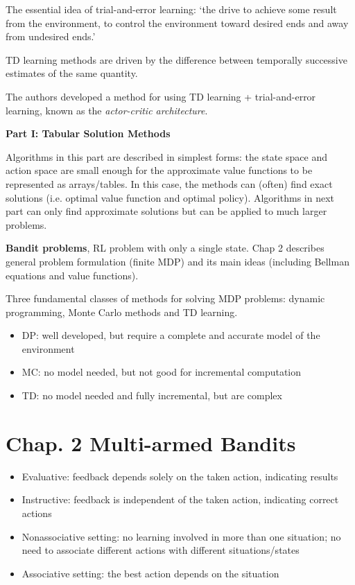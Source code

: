 \documentclass[lang=en,mode=geye,device=normal,color=blue,14pt]{elegantnote}
\DeclareMathOperator*{\1}{\mathbbm{1}}
\begin{document}
The essential idea of trial-and-error learning: `the drive to achieve some result from the environment, to control the environment toward desired ends and away from undesired ends.'

TD learning methods are driven by the difference between temporally successive estimates of the same quantity.

The authors developed a method for using TD learning + trial-and-error learning, known as the \textit{actor-critic architecture}.

\newpage
\textbf{Part I: Tabular Solution Methods}

Algorithms in this part are described in simplest forms: the state space and action space are small enough for the approximate value functions to be represented as arrays/tables.
In this case, the methods can (often) find exact solutions (i.e. optimal value function and optimal policy).
Algorithms in next part can only find approximate solutions but can be applied to much larger problems.

\textbf{Bandit problems}, RL problem with only a single state. Chap 2 describes general problem formulation (finite MDP) and its main ideas (including Bellman equations and value functions).

Three fundamental classes of methods for solving MDP problems: dynamic programming, Monte Carlo methods and TD learning.
\begin{itemize}
\item DP: well developed, but require a complete and accurate model of the environment
\item MC: no model needed, but not good for incremental computation
\item TD: no model needed and fully incremental, but are complex
\end{itemize}

\newpage
\section{Chap. 2 Multi-armed Bandits}
\begin{itemize}
\item Evaluative: feedback depends solely on the taken action, indicating results
\item Instructive: feedback is independent of the taken action, indicating correct actions
\item Nonassociative setting: no learning involved in more than one situation; no need to associate different actions with different situations/states
\item Associative setting: the best action depends on the situation
\end{itemize}
\end{document}
